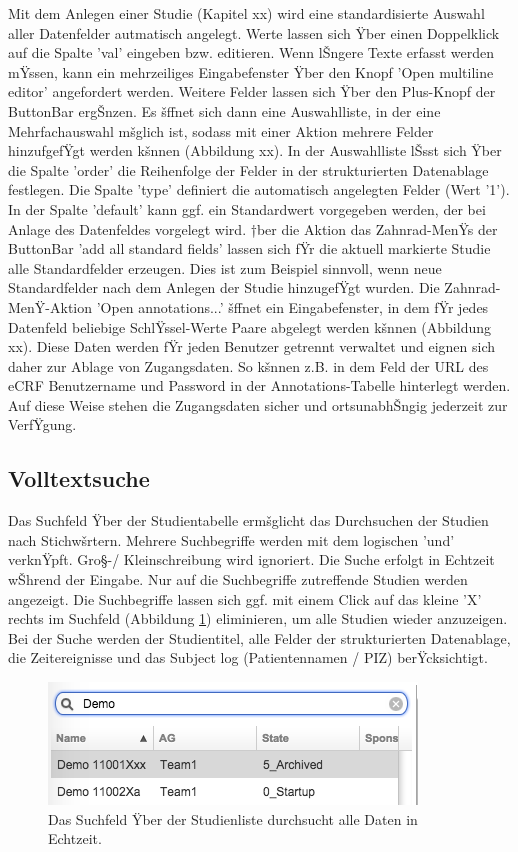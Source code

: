 \documentclass[11pt,oneside]{scrbook}
\begin{document}
Mit dem Anlegen einer Studie (Kapitel xx) wird eine standardisierte Auswahl aller Datenfelder autmatisch angelegt. Werte lassen sich Ÿber einen Doppelklick auf die Spalte 'val' eingeben bzw. editieren. Wenn lŠngere Texte erfasst werden mŸssen, kann ein mehrzeiliges Eingabefenster Ÿber den Knopf 'Open multiline editor' angefordert werden. Weitere Felder lassen sich Ÿber den Plus-Knopf der ButtonBar ergŠnzen. Es šffnet sich dann eine Auswahlliste, in der eine Mehrfachauswahl mšglich ist, sodass mit einer Aktion mehrere Felder hinzufgefŸgt werden kšnnen (Abbildung xx). In der Auswahlliste lŠsst sich  Ÿber die Spalte 'order' die Reihenfolge der Felder in der strukturierten Datenablage festlegen. Die Spalte 'type' definiert die automatisch angelegten Felder (Wert '1'). In der Spalte 'default' kann ggf. ein Standardwert vorgegeben werden, der bei Anlage des Datenfeldes vorgelegt wird.  †ber die Aktion das Zahnrad-MenŸs der ButtonBar 'add all standard fields' lassen sich fŸr die aktuell markierte Studie alle   Standardfelder erzeugen. Dies ist zum Beispiel sinnvoll, wenn  neue Standardfelder nach dem Anlegen der Studie hinzugefŸgt wurden. Die  Zahnrad-MenŸ-Aktion  'Open annotations...' šffnet ein  Eingabefenster, in dem fŸr jedes Datenfeld beliebige SchlŸssel-Werte Paare  abgelegt werden kšnnen (Abbildung xx). Diese Daten werden fŸr jeden Benutzer getrennt verwaltet und eignen sich daher  zur Ablage von Zugangsdaten. So kšnnen z.B. in dem Feld der URL des eCRF Benutzername und Password in der Annotations-Tabelle hinterlegt werden. Auf diese Weise stehen die Zugangsdaten sicher und ortsunabhŠngig jederzeit zur VerfŸgung. 

\subsection{Volltextsuche}
Das Suchfeld Ÿber der Studientabelle ermšglicht das Durchsuchen der Studien nach Stichwšrtern.  Mehrere Suchbegriffe werden mit dem logischen 'und' verknŸpft. Gro§-/ Kleinschreibung wird ignoriert. Die Suche erfolgt in Echtzeit wŠhrend der Eingabe. Nur  auf die Suchbegriffe zutreffende Studien werden angezeigt. Die Suchbegriffe lassen sich ggf. mit einem Click auf das kleine 'X'  rechts im Suchfeld (Abbildung \ref{fig:search}) eliminieren, um alle Studien wieder anzuzeigen. Bei der Suche werden der Studientitel, alle Felder der strukturierten Datenablage, die Zeitereignisse und das Subject log (Patientennamen / PIZ) berŸcksichtigt. %

\begin{figure}[htbp]
\begin{center}
\includegraphics[scale=0.84]{figs/search.png}
\caption{Das Suchfeld Ÿber der Studienliste durchsucht alle Daten in Echtzeit.}
\label{fig:search}
\end{center}
\end{figure}
\end{document}
